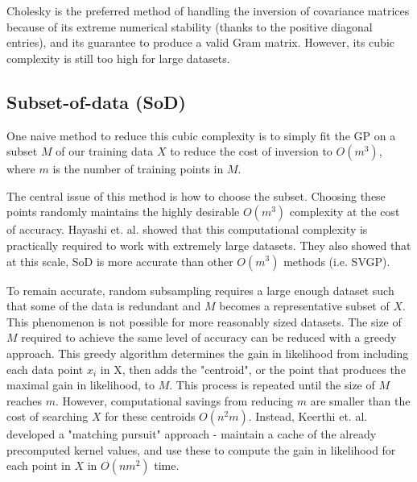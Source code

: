 Cholesky is the preferred method of handling the inversion of covariance matrices because of its extreme numerical stability (thanks to the positive diagonal entries), and its guarantee to produce a valid Gram matrix. However, its cubic complexity is still too high for large datasets.

\subsection{Subset-of-data (SoD)}
One naive method to reduce this cubic complexity is to simply fit the GP on a subset $M$ of our training data $X$ to reduce the cost of inversion to $O(m^3)$, where $m$ is the number of training points in $M$. 

The central issue of this method is how to choose the subset. Choosing these points randomly maintains the highly desirable $O(m^3)$ complexity at the cost of accuracy. Hayashi et. al. \cite{random-subsampling} showed that this computational complexity is practically required to work with extremely large datasets. They also showed that at this scale, SoD is more accurate than other $O(m^3)$ methods \cite{random-subsampling} (i.e. SVGP).

To remain accurate, random subsampling requires a large enough dataset such that some of the data is redundant and $M$ becomes a representative subset of $X$. This phenomenon is not possible for more reasonably sized datasets. The size of $M$ required to achieve the same level of accuracy can be reduced with a greedy approach. This greedy algorithm determines the gain in likelihood from including each data point $x_i$ in X, then adds the "centroid", or the point that produces the maximal gain in likelihood, to $M$. This process is repeated until the size of $M$ reaches $m$. However, computational savings from reducing $m$ are smaller than the cost of searching $X$ for these centroids $O(n^2m)$. Instead, Keerthi et. al. \cite{matching-pursuit} developed a "matching pursuit" approach - maintain a cache of the already precomputed kernel values, and use these to compute the gain in likelihood for each point in $X$ in $O(nm^2)$ time. 

